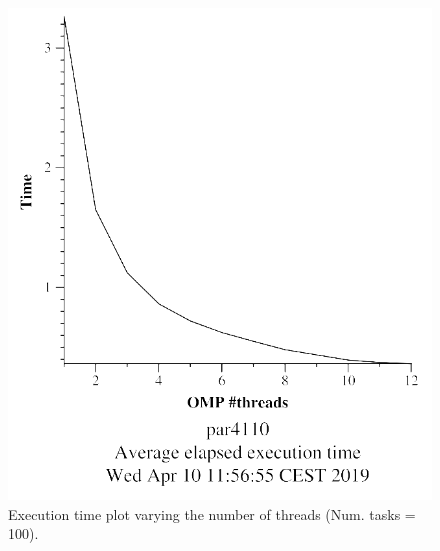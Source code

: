 \documentclass[12pt, a4paper]{article}
\begin{document}
\begin{figure}[H]
\centering
\begin{minipage}[b]{0.4\linewidth}
  \centering
  \includegraphics[scale=0.5]{./mandel-omp-10000-strong-omp-3-100-time}
  \caption{Execution time plot varying the number of threads (Num. tasks = 100).}
  \label{fig:mandel-omp-10000-strong-omp-3-100-time}
\end{minipage}%
\hspace{0.5cm}
\begin{minipage}[b]{0.4\linewidth}
  \centering

\end{minipage}
\end{figure}
\end{document}
